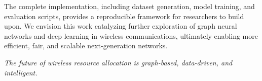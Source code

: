 The complete implementation, including dataset generation, model training, and evaluation scripts, provides a reproducible framework for researchers to build upon. We envision this work catalyzing further exploration of graph neural networks and deep learning in wireless communications, ultimately enabling more efficient, fair, and scalable next-generation networks.

\vspace{1cm}

\begin{center}
\textit{The future of wireless resource allocation is graph-based, data-driven, and intelligent.}
\end{center}
